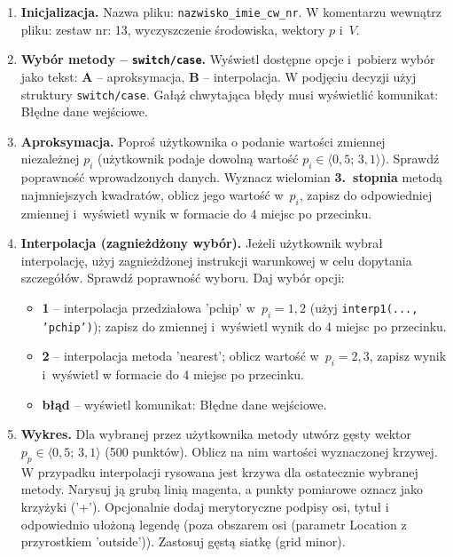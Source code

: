 \documentclass[a4paper,11pt]{article}
\begin{document}
\begin{enumerate}[leftmargin=*, label=\textbf{\arabic*.}, itemsep=2pt]

  \item \textbf{Inicjalizacja.}
    Nazwa pliku: \texttt{nazwisko\_imie\_cw\_nr}. W komentarzu wewnątrz pliku: zestaw nr: 13, wyczyszczenie środowiska, wektory $p$ i~$V$.

  \item \textbf{Wybór metody -- \texttt{switch/case}.}
    Wyświetl dostępne opcje i~pobierz wybór jako tekst: \textbf{A} -- aproksymacja, \textbf{B} -- interpolacja. W podjęciu decyzji użyj struktury \texttt{switch/case}. Gałąź chwytająca błędy musi wyświetlić komunikat: Błędne dane wejściowe.

  \item \textbf{Aproksymacja.}
    Poproś użytkownika o podanie wartości zmiennej niezależnej $p_i$ (użytkownik podaje dowolną wartość $p_i \in \langle 0{,}5;\,3{,}1 \rangle$). Sprawdź poprawność wprowadzonych danych. Wyznacz wielomian \textbf{3.~stopnia} metodą najmniejszych kwadratów, oblicz jego wartość w~$p_i$, zapisz do odpowiedniej zmiennej i~wyświetl wynik w formacie do 4 miejsc po przecinku.

  \item \textbf{Interpolacja (zagnieżdżony wybór).}
    Jeżeli użytkownik wybrał interpolację, użyj zagnieżdżonej instrukcji warunkowej w celu dopytania szczegółów. Sprawdź poprawność wyboru. Daj wybór opcji:
    \begin{itemize}[itemsep=1pt]
      \item \textbf{1} -- interpolacja przedziałowa 'pchip' w~$p_i = 1{,}2$ (użyj \texttt{interp1(..., 'pchip')}); zapisz do zmiennej i~wyświetl wynik do 4 miejsc po przecinku.
      \item \textbf{2} -- interpolacja metoda 'nearest'; oblicz wartość w~$p_i = 2{,}3$, zapisz wynik i~wyświetl w formacie do 4 miejsc po przecinku.
      \item \textbf{błąd} -- wyświetl komunikat: Błędne dane wejściowe.
    \end{itemize}

  \item \textbf{Wykres.}
    Dla wybranej przez użytkownika metody utwórz gęsty wektor $p_p \in \langle 0{,}5;\,3{,}1 \rangle$ (500 punktów). Oblicz na nim wartości wyznaczonej krzywej. W przypadku interpolacji rysowana jest krzywa dla ostatecznie wybranej metody. Narysuj ją grubą linią magenta, a punkty pomiarowe oznacz jako krzyżyki ('+'). Opcjonalnie dodaj merytoryczne podpisy osi, tytuł i odpowiednio ułożoną legendę (poza obszarem osi (parametr Location z przyrostkiem 'outside')). Zastosuj gęstą siatkę (grid minor).

\end{enumerate}
\end{document}
